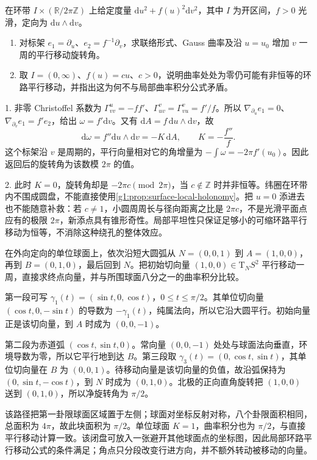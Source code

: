 \begin{exercise}\label{g1:ex:warped-annulus-holonomy}
	在环带 \(I\times(\mathbb R/2\pi\mathbb Z)\) 上给定度量 \(\mathrm{d}u^2+f(u)^2\mathrm{d}v^2\)，其中 \(I\) 为开区间，\(f>0\) 光滑，定向为 \(\mathrm{d}u\wedge\mathrm{d}v\)。
	\begin{enumerate}
		\item 对标架 \(e_1=\partial_u\)、\(e_2=f^{-1}\partial_v\)，求联络形式、Gauss 曲率及沿 \(u=u_0\) 增加 \(v\) 一周的平行移动旋转角。
		\item 取 \(I=(0,\infty)\)、\(f(u)=cu\)、\(c>0\)，说明曲率处处为零仍可能有非恒等的环路平行移动，并指出这为何不与局部曲率积分公式矛盾。
	\end{enumerate}
\end{exercise}
\begin{solution}
	1. 非零 Christoffel 系数为 \(\Gamma^u_{vv}=-ff'\)、\(\Gamma^v_{uv}=\Gamma^v_{vu}=f'/f\)。所以 \(\nabla_{\partial_u}e_1=0\)、\(\nabla_{\partial_v}e_1=f'e_2\)，给出 \(\omega=f'\mathrm{d}v\)。又有 \(\mathrm{d}A=f\,\mathrm{d}u\wedge\mathrm{d}v\)，故
	\[
		\mathrm{d}\omega=f''\mathrm{d}u\wedge\mathrm{d}v=-K\,\mathrm{d}A,
		\qquad K=-\frac{f''}{f}.
	\]
	这个标架沿 \(v\) 是周期的，平行向量相对它的角增量为 \(-\int\omega=-2\pi f'(u_0)\)。因此返回后的旋转角为该数模 \(2\pi\) 的值。

	2. 此时 \(K=0\)，旋转角却是 \(-2\pi c\pmod{2\pi}\)，当 \(c\notin\mathbb Z\) 时并非恒等。纬圈在环带内不围成圆盘，不能直接使用\cref{g1:prop:surface-local-holonomy}。把 \(u=0\) 添进去也不能随意补救：若 \(c\ne1\)，小圆周周长与径向距离之比是 \(2\pi c\)，不是光滑平面点应有的极限 \(2\pi\)，新添点具有锥形奇性。局部平坦性只保证足够小的可缩环路平行移动为恒等，不消除这种绕孔的整体效应。
\end{solution}

\begin{exercise}\label{g1:ex:sphere-octant-transport}
	在外向定向的单位球面上，依次沿短大圆弧从 \(N=(0,0,1)\) 到 \(A=(1,0,0)\)，再到 \(B=(0,1,0)\)，最后回到 \(N\)。把初始切向量 \((1,0,0)\in \mathrm{T}_NS^2\) 平行移动一周，直接求终点向量，并与所围球面八分之一的曲率积分比较。
\end{exercise}
\begin{solution}
	第一段可写 \(\gamma_1(t)=(\sin t,0,\cos t)\)，\(0\le t\le\pi/2\)。其单位切向量 \((\cos t,0,-\sin t)\) 的导数为 \(-\gamma_1(t)\)，纯属法向，所以它沿大圆平行。初始向量正是该切向量，到 \(A\) 时成为 \((0,0,-1)\)。

	第二段为赤道弧 \((\cos t,\sin t,0)\)。常向量 \((0,0,-1)\) 处处与球面法向垂直，环境导数为零，所以它平行地到达 \(B\)。第三段取 \(\gamma_3(t)=(0,\cos t,\sin t)\)，其单位切向量在 \(B\) 为 \((0,0,1)\)。待移动向量是该切向量的负值，故沿弧保持为 \((0,\sin t,-\cos t)\)，到 \(N\) 时成为 \((0,1,0)\)。北极的正向直角旋转把 \((1,0,0)\) 送到 \((0,1,0)\)，所以净旋转角为 \(\pi/2\)。

	该路径把第一卦限球面区域置于左侧；球面对坐标反射对称，八个卦限面积相同，总面积为 \(4\pi\)，故此块面积为 \(\pi/2\)。单位球面 \(K=1\)，曲率积分也为 \(\pi/2\)，与直接平行移动计算一致。该闭盘可放入一张避开其他球面点的坐标图，因此局部环路平行移动公式的条件满足；角点只分段改变行进方向，并不额外转动被移动的向量。
\end{solution}

